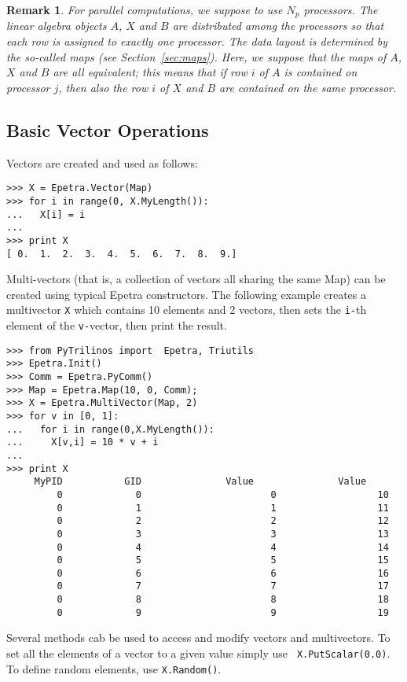 \documentclass[10pt,relax]{SANDreport}
\newtheorem{remark}{Remark}
\begin{document}
\begin{remark}
For parallel computations, we suppose to use $N_p$ processors. The linear
algebra objects $A$, $X$ and $B$ are distributed among the processors so that
each row is assigned to exactly one processor. The data layout is determined
by the so-called maps (see Section~\ref{sec:maps}). Here, we suppose that the
maps of $A$, $X$ and $B$ are all equivalent; this means that if row $i$ of $A$
is contained on processor $j$, then also the row $i$ of $X$ and $B$ are
contained on the same processor.
\end{remark}

\subsection{Basic Vector Operations}
\label{sec:vectors}

Vectors are created and used as follows:
\begin{verbatim}
>>> X = Epetra.Vector(Map)
>>> for i in range(0, X.MyLength()):
...   X[i] = i
... 
>>> print X
[ 0.  1.  2.  3.  4.  5.  6.  7.  8.  9.]
\end{verbatim}

Multi-vectors (that is, a collection of vectors all sharing the
same Map) can be created using typical Epetra
constructors. The following example creates a multivector {\tt X} which
contains 10 elements and 2 vectors, then sets the {\tt i-}th element of the
{\tt v-}vector, then print the result.
\begin{verbatim}
>>> from PyTrilinos import  Epetra, Triutils
>>> Epetra.Init()
>>> Comm = Epetra.PyComm()
>>> Map = Epetra.Map(10, 0, Comm);
>>> X = Epetra.MultiVector(Map, 2)
>>> for v in [0, 1]:
...   for i in range(0,X.MyLength()):
...     X[v,i] = 10 * v + i
...
>>> print X
     MyPID           GID               Value               Value  
         0             0                       0                  10
         0             1                       1                  11
         0             2                       2                  12
         0             3                       3                  13
         0             4                       4                  14
         0             5                       5                  15
         0             6                       6                  16
         0             7                       7                  17
         0             8                       8                  18
         0             9                       9                  19
\end{verbatim}
Several methods cab be used to access and modify vectors and multivectors.
To set all the elements of a vector to a given value simply use {\tt
  X.PutScalar(0.0)}. To define random elements, use {\tt X.Random()}.
\end{document}
